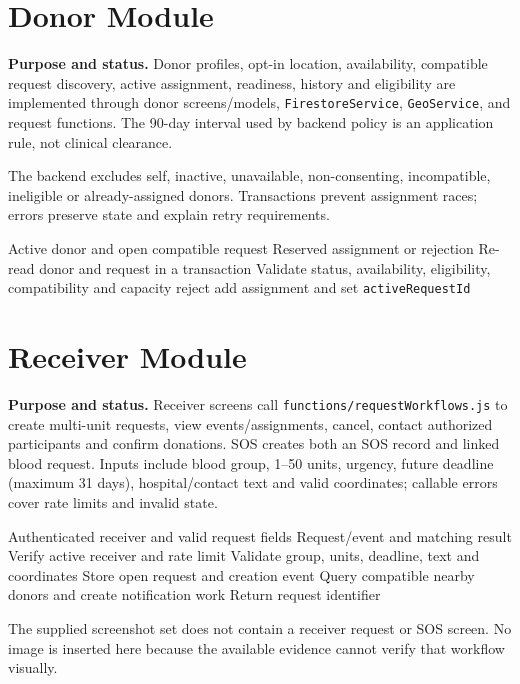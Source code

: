 \section{Donor Module}
\textbf{Purpose and status.} Donor profiles, opt-in location, availability, compatible request discovery, active assignment, readiness, history and eligibility are implemented through donor screens/models, \texttt{FirestoreService}, \texttt{GeoService}, and request functions. The 90-day interval used by backend policy is an application rule, not clinical clearance.

The backend excludes self, inactive, unavailable, non-consenting, incompatible, ineligible or already-assigned donors. Transactions prevent assignment races; errors preserve state and explain retry requirements.
\begin{algorithm}[H]\caption{Accept a donor assignment}\begin{algorithmic}[1]
\Require Active donor and open compatible request \Ensure Reserved assignment or rejection
\State Re-read donor and request in a transaction
\State Validate status, availability, eligibility, compatibility and capacity
 \State reject \Else \State add assignment and set \texttt{activeRequestId} \EndIf
\end{algorithmic}\end{algorithm}

\section{Receiver Module}
\textbf{Purpose and status.} Receiver screens call \texttt{functions/requestWorkflows.js} to create multi-unit requests, view events/assignments, cancel, contact authorized participants and confirm donations. SOS creates both an SOS record and linked blood request. Inputs include blood group, 1--50 units, urgency, future deadline (maximum 31 days), hospital/contact text and valid coordinates; callable errors cover rate limits and invalid state.
\begin{algorithm}[H]\caption{Create and process a blood request}\begin{algorithmic}[1]
\Require Authenticated receiver and valid request fields \Ensure Request/event and matching result
\State Verify active receiver and rate limit
\State Validate group, units, deadline, text and coordinates
\State Store open request and creation event
\State Query compatible nearby donors and create notification work
\State Return request identifier
\end{algorithmic}\end{algorithm}
The supplied screenshot set does not contain a receiver request or SOS screen. No image is inserted here because the available evidence cannot verify that workflow visually.

